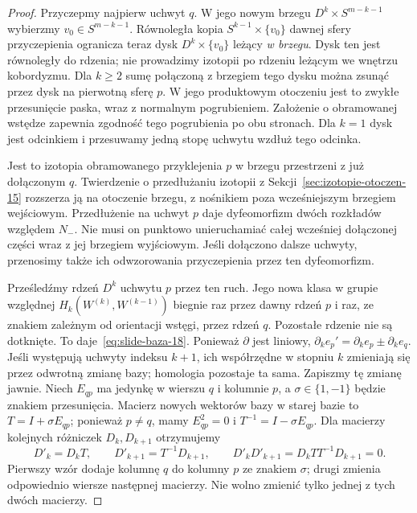 \begin{proof}
Przyczepmy najpierw uchwyt $q$.
W jego nowym brzegu $D^k\times S^{m-k-1}$
wybierzmy $v_0\in S^{m-k-1}$.
Równoległa kopia $S^{k-1}\times\{v_0\}$ dawnej
sfery przyczepienia ogranicza teraz dysk
$D^k\times\{v_0\}$ leżący \emph{w brzegu}.
Dysk ten jest równoległy do rdzenia; nie prowadzimy
izotopii po rdzeniu leżącym we wnętrzu kobordyzmu.
Dla $k\geq2$ sumę połączoną z brzegiem tego dysku
można zsunąć przez dysk na pierwotną sferę $p$.
W jego produktowym otoczeniu jest to zwykłe
przesunięcie paska, wraz z normalnym pogrubieniem.
Założenie o obramowanej wstędze zapewnia zgodność
tego pogrubienia po obu stronach.
Dla $k=1$ dysk jest odcinkiem i przesuwamy
jedną stopę uchwytu wzdłuż tego odcinka.

Jest to izotopia obramowanego przyklejenia $p$
w brzegu przestrzeni z już dołączonym $q$.
Twierdzenie o przedłużaniu izotopii z
Sekcji~\ref{sec:izotopie-otoczen-15} rozszerza ją
na otoczenie brzegu, z nośnikiem poza wcześniejszym
brzegiem wejściowym. Przedłużenie na uchwyt $p$
daje dyfeomorfizm dwóch rozkładów względem $N_-$.
Nie musi on punktowo unieruchamiać całej wcześniej
dołączonej części wraz z jej brzegiem wyjściowym.
Jeśli dołączono dalsze uchwyty, przenosimy także
ich odwzorowania przyczepienia przez ten dyfeomorfizm.

Prześledźmy rdzeń $D^k$ uchwytu $p$
przez ten ruch. Jego nowa klasa
w grupie względnej
$H_k(W^{(k)},W^{(k-1)})$
biegnie raz przez dawny rdzeń $p$
i raz, ze znakiem zależnym od
orientacji wstęgi, przez rdzeń $q$.
Pozostałe rdzenie nie są dotknięte.
To daje~\eqref{eq:slide-baza-18}.
Ponieważ $\partial$ jest liniowy,
$\partial_k e_p'
 =\partial_k e_p\pm\partial_k e_q$.
Jeśli występują uchwyty indeksu $k+1$,
ich współrzędne w stopniu $k$ zmieniają
się przez odwrotną zmianę bazy;
homologia pozostaje ta sama.
Zapiszmy tę zmianę jawnie. Niech $E_{qp}$ ma jedynkę
w wierszu $q$ i kolumnie $p$, a $\sigma\in\{1,-1\}$ będzie
znakiem przesunięcia. Macierz nowych wektorów bazy w starej
bazie to $T=I+\sigma E_{qp}$; ponieważ $p\ne q$, mamy
$E_{qp}^2=0$ i $T^{-1}=I-\sigma E_{qp}$.
Dla macierzy kolejnych różniczek $D_k,D_{k+1}$ otrzymujemy
\[
 D'_k=D_kT,\qquad D'_{k+1}=T^{-1}D_{k+1},\qquad
 D'_kD'_{k+1}=D_kTT^{-1}D_{k+1}=0.
\]
Pierwszy wzór dodaje kolumnę $q$ do kolumny $p$ ze znakiem
$\sigma$; drugi zmienia odpowiednio wiersze następnej macierzy.
Nie wolno zmienić tylko jednej z tych dwóch macierzy.
\end{proof}

